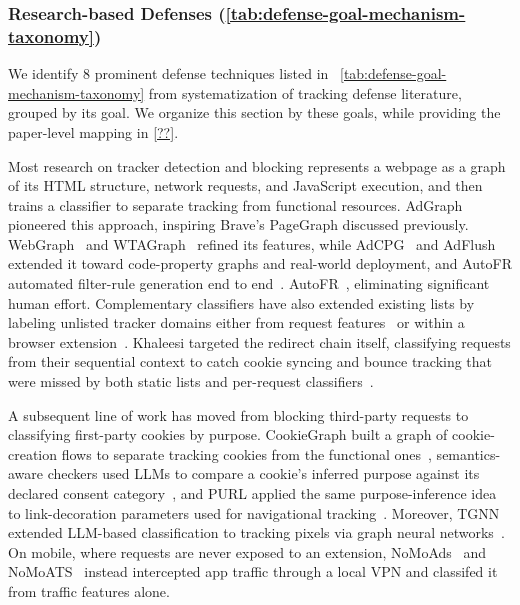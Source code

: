 \subsubsection{Research-based Defenses (\autoref{tab:defense-goal-mechanism-taxonomy})}
\label{sec:stateful-defenses-research}



We identify 8 prominent defense techniques listed in ~\autoref{tab:defense-goal-mechanism-taxonomy} from systematization of tracking defense literature, grouped by its goal.
%
We organize this section by these goals, while providing the paper-level mapping in \autoref{??}. 




%
Most research on tracker detection and blocking represents a webpage as a graph of its HTML structure, network requests, and JavaScript execution, and then trains a classifier to separate tracking from functional resources. 
%
AdGraph~\cite{iqbalAdGraphGraphBasedApproach2020} pioneered this approach, inspiring Brave's PageGraph discussed previously. 
%
WebGraph~\cite{sibyWebGraphCapturingAdvertising2022} and WTAGraph~\cite{yangWTAGRAPHWebTracking2022} refined its features, while AdCPG~\cite{leeAdCPGClassifyingJavaScript2023} and AdFlush~\cite{leeAdFlushRealWorldDeployable2024} extended it toward code-property graphs and real-world deployment, and AutoFR automated filter-rule generation end to end~\cite{leAutoFRAutomatedFilter2023}. AutoFR~\cite{leAutoFRAutomatedFilter2023}, eliminating significant human effort.
%
Complementary classifiers have also extended existing lists by labeling unlisted tracker domains either from request features~\cite{gugelmannAutomatedApproachComplementing2015,ikramSeamlessTrackingFreeWeb2017} or within a browser extension~\cite{reitingerMLCBMachineLearning2021}.
%
Khaleesi targeted the redirect chain itself, classifying requests from their sequential context to catch cookie syncing and bounce tracking that were missed by both static lists and per-request classifiers~\cite{iqbalKhaleesiBreakerAdvertising2022}.


A subsequent line of work has moved from blocking third-party requests to classifying first-party cookies by purpose. 
%
CookieGraph built a graph of cookie-creation flows to separate tracking cookies from the functional ones~\cite{munirCookieGraphUnderstandingDetecting2023}, semantics-aware checkers used LLMs to compare a cookie's inferred purpose against its declared consent category~\cite{chenSemanticsAwareCookiePurpose2025}, and PURL applied the same purpose-inference idea to link-decoration parameters used for navigational tracking~\cite{munirPURLSafeEffective2024}.
%
Moreover, TGNN extended LLM-based classification to tracking pixels via graph neural networks~\cite{xiongTGNNEnhancingPixel2026}.
%
On mobile, where requests are never exposed to an extension, NoMoAds~\cite{shubaNoMoAdsEffectiveEfficient2018} and NoMoATS~\cite{shubaNoMoATSAutomaticDetection2020} instead intercepted app traffic through a local VPN and classifed it from traffic features alone.



